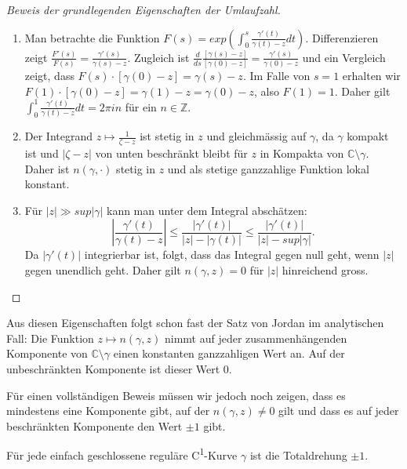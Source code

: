 \begin{proof}[Beweis der grundlegenden Eigenschaften der Umlaufzahl]
    \begin{enumerate}
        \item Man betrachte die Funktion $F(s) = exp(\int_0^s \frac{\gamma'(t)}{\gamma(t) - z} dt)$. 
            Differenzieren zeigt $\frac{F'(s)}{F(s)} = \frac{\gamma'(s)}{\gamma(s) - z}$. 
            Zugleich ist $\frac{d}{ds} \frac{[\gamma(s) -z]}{[\gamma(0) -z]} = \frac{\gamma'(s)}{\gamma(0) - z}$ und ein Vergleich zeigt, dass $F(s) \cdot [\gamma(0) - z] = \gamma(s) -z$. 
            Im Falle von $s = 1$ erhalten wir $F(1) \cdot [\gamma(0) - z] = \gamma(1) -z = \gamma(0) - z$, also $F(1) = 1$.
            Daher gilt $\int_0^1 \frac{\gamma'(t)}{\gamma(t) - z} dt = 2 \pi i n$ für ein $n \in \mathbb{Z}$.
        \item Der Integrand $z \mapsto \frac{1}{\zeta - z}$ ist stetig in $z$ und gleichmässig auf $\gamma$, da $\gamma$ kompakt ist und $|\zeta - z|$ von unten beschränkt bleibt für $z$ in Kompakta von $\mathbb{C} \setminus \gamma$. 
            Daher ist $n(\gamma, \cdot)$ stetig in $z$ und als stetige ganzzahlige Funktion lokal konstant.
        \item Für $|z| \gg sup |\gamma|$ kann man unter dem Integral abschätzen: 
            \[
                \left| \frac{\gamma'(t)}{\gamma(t) - z} \right| \leq \frac{|\gamma'(t)|}{|z| - |\gamma(t)|} \leq \frac{|\gamma'(t)|}{|z| - sup |\gamma|}.
            \]
            Da $|\gamma'(t)|$ integrierbar ist, folgt, dass das Integral gegen null geht, wenn $|z|$ gegen unendlich geht. 
            Daher gilt $n(\gamma, z) = 0$ für $|z|$ hinreichend gross.
    \end{enumerate}
\end{proof}

Aus diesen Eigenschaften folgt schon fast der Satz von Jordan im analytischen Fall: Die Funktion $z \mapsto n(\gamma, z)$ nimmt auf jeder zusammenhängenden Komponente von $\mathbb{C} \setminus \gamma$ einen konstanten ganzzahligen Wert an. 
Auf der unbeschränkten Komponente ist dieser Wert $0$. 

Für einen vollständigen Beweis müssen wir jedoch noch zeigen, dass es mindestens eine Komponente gibt, auf der $n(\gamma, z) \neq 0$ gilt und dass es auf jeder beschränkten Komponente den Wert $\pm 1$ gibt.

\begin{satz}
    Für jede einfach geschlossene reguläre C\textsuperscript{1}-Kurve $\gamma$ ist die Totaldrehung $\pm 1$. 
\end{satz}

